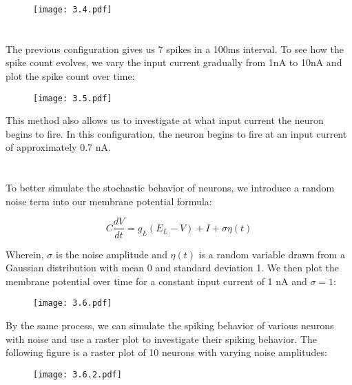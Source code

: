 \documentclass{article}
\begin{document}
\begin{figure}[ht]
    \centering
    \texttt{[image: 3.4.pdf]}
\end{figure}


\section{}
The previous configuration gives us 7 spikes in a 100ms interval. To see how the spike count evolves, we vary the input current gradually from 1nA to 10nA and plot the spike count over time:

\begin{figure}[ht]
    \centering
    \texttt{[image: 3.5.pdf]}
\end{figure}

\FloatBarrier
This method also allows us to investigate at what input current the neuron begins to fire. In this configuration, the neuron begins to fire at an input current of approximately 0.7 nA.
\vspace{8px}


\section{}
To better simulate the stochastic behavior of neurons, we introduce a random noise term into our membrane potential formula: 

\begin{equation}
    C \frac{dV}{dt} = g_L (E_L - V) + I + \sigma\eta(t)
\end{equation}
\vspace{4px}

Wherein, $\sigma$ is the noise amplitude and $\eta(t)$ is a random variable drawn from a Gaussian distribution with mean 0 and standard deviation 1. We then plot the membrane potential over time for a constant input current of 1 nA and $\sigma = 1$:

\begin{figure}[ht]
    \centering
    \texttt{[image: 3.6.pdf]}
\end{figure}

\FloatBarrier
By the same process, we can simulate the spiking behavior of various neurons with noise and use a raster plot to investigate their spiking behavior. The following figure is a raster plot of 10 neurons with varying noise amplitudes:

\begin{figure}[ht]
    \centering
    \texttt{[image: 3.6.2.pdf]}   
\end{figure}
\vspace{-10pt}
\end{document}
